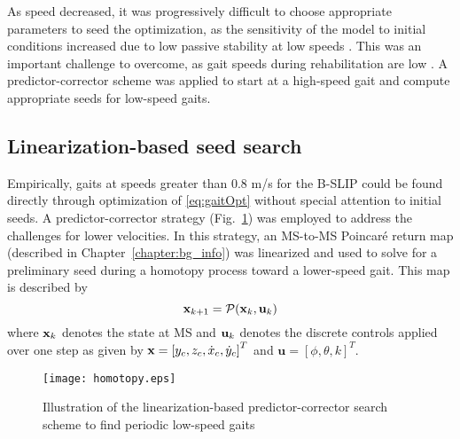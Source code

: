 As speed decreased, it was progressively difficult to choose appropriate parameters to seed the optimization, as the sensitivity of the model to initial conditions increased due to low passive stability at low speeds \cite{kuo2001simple}. This was an important challenge to overcome, as gait speeds during rehabilitation are low \cite{seethapathi2015metabolic}. A predictor-corrector scheme was applied to start at a high-speed gait and compute appropriate seeds for low-speed gaits. 

\subsection{Linearization-based seed search}\label{sec:gait_lib}

Empirically, gaits at speeds greater than 0.8 m/s for the B-SLIP could be found directly through optimization of \eqref{eq:gaitOpt} without special attention to initial seeds. A predictor-corrector strategy (Fig.~\ref{fig:homotopy}) was employed to address the challenges for lower velocities. In this strategy, an MS-to-MS Poincar\'e return map (described in Chapter~\ref{chapter:bg_info}) was linearized and used to solve for a preliminary seed during a homotopy process toward a lower-speed gait. This map is described by
%
\begin{equation}
	\mathbf{x}_{k+1} = \mathcal{P}(\mathbf{x}_k ,\mathbf{u}_k)
\end{equation}
%
where $\mathbf{x}_k$ denotes the state at MS and $\mathbf{u}_k$ denotes the discrete controls applied over one step as given by $ \mathbf{x} = \left[y_c ,z_c ,\dot{x}_c ,\dot{y}_c\right]^T $ and $ \mathbf{u} = \left[\phi ,\theta ,k\right]^T $.

\begin{figure}
	\centering
	\texttt{[image: homotopy.eps]}
	\caption{Illustration of the linearization-based predictor-corrector search scheme to find periodic low-speed gaits}\label{fig:homotopy}
\end{figure}

